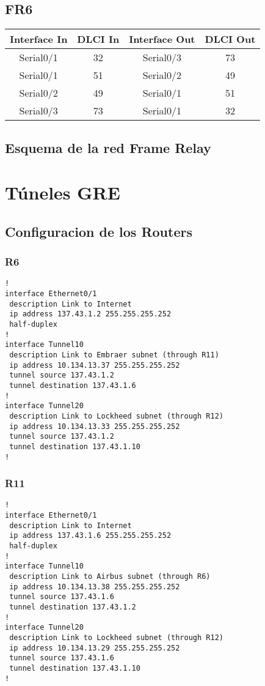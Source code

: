 \documentclass[12pt, a4paper, spanish]{article}
\begin{document}
\subsection{FR6}
\begin{center}
\begin{tabular}{|c|c|c|c|}
\hline
Interface In & DLCI In & Interface Out & DLCI Out \\
\hline
\hline
Serial0/1 & 32 & Serial0/3 & 73 \\
\hline
Serial0/1 & 51 & Serial0/2 & 49 \\
\hline
Serial0/2 & 49 & Serial0/1 & 51 \\
\hline
Serial0/3 & 73 & Serial0/1 & 32 \\
\hline
\end{tabular}
\end{center}

\newpage
\subsection{Esquema de la red Frame Relay}


\newpage
\section{Túneles GRE}
\subsection{Configuracion de los Routers}
\subsubsection{R6}
{\small
\begin{verbatim}
!
interface Ethernet0/1
 description Link to Internet
 ip address 137.43.1.2 255.255.255.252
 half-duplex
!
interface Tunnel10
 description Link to Embraer subnet (through R11)
 ip address 10.134.13.37 255.255.255.252
 tunnel source 137.43.1.2
 tunnel destination 137.43.1.6
!
interface Tunnel20
 description Link to Lockheed subnet (through R12)
 ip address 10.134.13.33 255.255.255.252
 tunnel source 137.43.1.2
 tunnel destination 137.43.1.10
!
\end{verbatim}
}

\subsubsection{R11}
{\small
\begin{verbatim}
!
interface Ethernet0/1
 description Link to Internet
 ip address 137.43.1.6 255.255.255.252
 half-duplex
!
interface Tunnel10
 description Link to Airbus subnet (through R6)
 ip address 10.134.13.38 255.255.255.252
 tunnel source 137.43.1.6
 tunnel destination 137.43.1.2
!
interface Tunnel20
 description Link to Lockheed subnet (through R12)
 ip address 10.134.13.29 255.255.255.252
 tunnel source 137.43.1.6
 tunnel destination 137.43.1.10
!
\end{verbatim}
}
\end{document}
